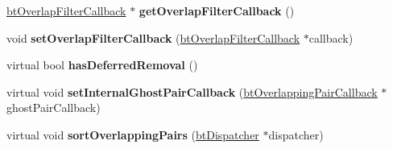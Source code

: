 \begin{DoxyCompactItemize}
\hyperlink{structbtOverlapFilterCallback}{bt\+Overlap\+Filter\+Callback} $\ast$ {\bfseries get\+Overlap\+Filter\+Callback} ()
\item 
\mbox{\label{classbtSortedOverlappingPairCache_a80a1d641ded9fb21e9b4144e43bca664}} 
void {\bfseries set\+Overlap\+Filter\+Callback} (\hyperlink{structbtOverlapFilterCallback}{bt\+Overlap\+Filter\+Callback} $\ast$callback)
\item 
\mbox{\label{classbtSortedOverlappingPairCache_a6b0a1c63e64e7975275b0c535261bc47}} 
virtual bool {\bfseries has\+Deferred\+Removal} ()
\item 
\mbox{\label{classbtSortedOverlappingPairCache_a15ec25362baaa8e2eaad2a0f3c04aaa5}} 
virtual void {\bfseries set\+Internal\+Ghost\+Pair\+Callback} (\hyperlink{classbtOverlappingPairCallback}{bt\+Overlapping\+Pair\+Callback} $\ast$ghost\+Pair\+Callback)
\item 
\mbox{\label{classbtSortedOverlappingPairCache_ac7b127e1e47b8e92cf9efd51d3183bfd}} 
virtual void {\bfseries sort\+Overlapping\+Pairs} (\hyperlink{classbtDispatcher}{bt\+Dispatcher} $\ast$dispatcher)
\end{DoxyCompactItemize}
